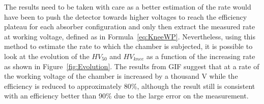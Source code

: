 	The results need to be taken with care as a better estimation of the rate would have been to push the detector towards higher voltages to reach the efficiency plateau for each absorber configuration and only then extract the measured rate at working voltage, defined as in Formula~\ref{eq:KneeWP}. Nevertheless, using this method to estimate the rate to which the chamber is subjected, it is possible to look at the evolution of the $HV_{50}$ and $HV_{knee}$ as a function of the increasing rate as shown in Figure~\ref{fig:Evolution}. The results from GIF suggest that at a rate of  the working voltage of the chamber is increased by a thousand \si{V} while the efficiency is reduced to approximately 80\%, although the result still is consistent with an efficiency better than 90\% due to the large error on the measurement.
	
